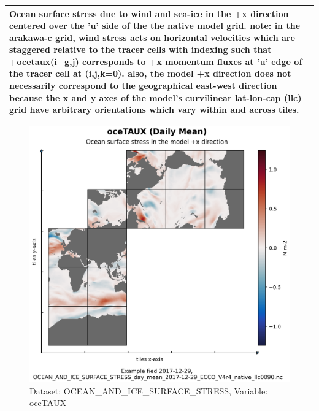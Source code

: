 \begin{longtable}{|m{}|m{}|m{}|m{}|}
\multicolumn{4}{|p{1\textwidth}|}{Ocean surface stress due to wind and sea-ice in the +x direction centered over the 'u' side of the the native model grid. note: in the arakawa-c grid, wind stress acts on horizontal velocities which are staggered relative to the tracer cells with indexing such that +ocetaux(i\_g,j) corresponds to +x momentum fluxes at 'u' edge of the tracer cell at (i,j,k=0). also, the model +x direction does not necessarily correspond to the geographical east-west direction because the x and y axes of the model's curvilinear lat-lon-cap (llc) grid have arbitrary orientations which vary within and across tiles.} \\ \hline
\end{longtable}

\begin{figure}[H]
\centering
\includegraphics[scale=0.55]{../images/plots/native_plots/Ocean_and_Sea-Ice_Surface_Stress/oceTAUX.png}
\caption{Dataset: OCEAN\_AND\_ICE\_SURFACE\_STRESS, Variable: oceTAUX}
\label{tab:table-OCEAN_AND_ICE_SURFACE_STRESS_oceTAUX-Plot}
\end{figure}
\pagebreak

